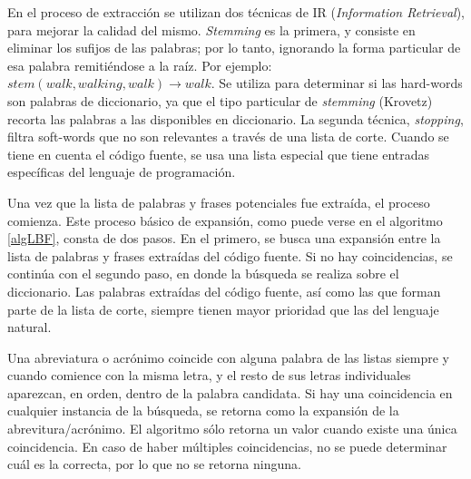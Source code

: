En el proceso de extracción se utilizan dos técnicas de IR (\textit{Information Retrieval}), para mejorar la calidad del mismo.
\textit{Stemming} es la primera, y consiste en eliminar los sufijos de las palabras; por lo tanto, ignorando la forma particular de esa palabra remitiéndose a la raíz.
Por ejemplo: $stem(walk, walking, walk) \rightarrow walk$.
Se utiliza para determinar si las hard-words son palabras de diccionario, ya que el tipo particular de \textit{stemming} (Krovetz) recorta las palabras a las disponibles en diccionario.
La segunda técnica, \textit{stopping}, filtra soft-words que no son relevantes a través de una lista de corte.
Cuando se tiene en cuenta el código fuente, se usa una lista especial que tiene entradas específicas del lenguaje de programación.

Una vez que la lista de palabras y frases potenciales fue extraída, el proceso comienza. 
Este proceso básico de expansión, como puede verse en el algoritmo \ref{algLBF}, consta de dos pasos.
En el primero, se busca una expansión entre la lista de palabras y frases extraídas del código fuente.
Si no hay coincidencias, se continúa con el segundo paso, en donde la búsqueda se realiza sobre el diccionario.
Las palabras extraídas del código fuente, así como las que forman parte de la lista de corte, siempre tienen mayor prioridad que las del lenguaje natural.

Una abreviatura o acrónimo coincide con alguna palabra de las listas siempre y cuando comience con la misma letra, y el resto de sus letras individuales aparezcan, en orden, dentro de la palabra candidata.
Si hay una coincidencia en cualquier instancia de la búsqueda, se retorna como la expansión de la abrevitura/acrónimo.
El algoritmo sólo retorna un valor cuando existe una única coincidencia.
En caso de haber múltiples coincidencias, no se puede determinar cuál es la correcta, por lo que no se retorna ninguna.

